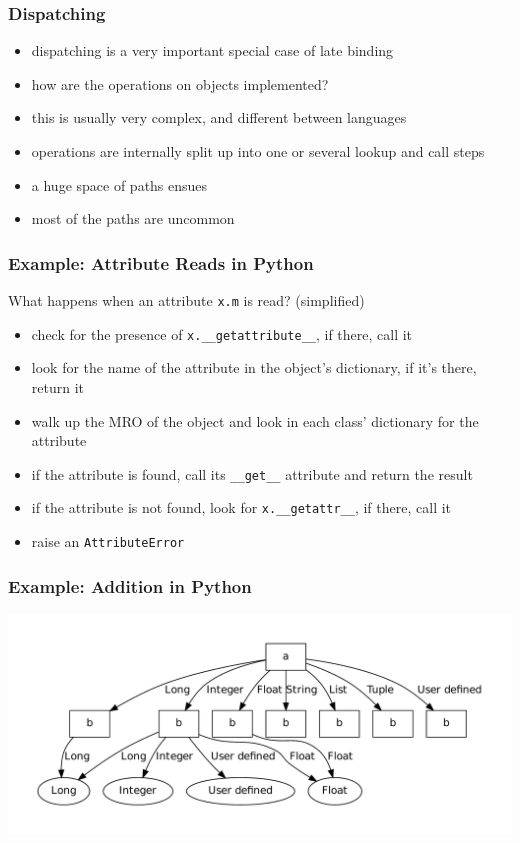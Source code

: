 \documentclass[utf8x]{beamer}
\begin{document}
\begin{frame}
  \frametitle{Dispatching}
  \begin{itemize}
      \item dispatching is a very important special case of late binding
      \item how are the operations on objects implemented?
      \item this is usually very complex, and different between languages
      \pause
      \item operations are internally split up into one or several lookup and call steps
      \item a huge space of paths ensues
      \item most of the paths are uncommon
  \end{itemize}
\end{frame}

\begin{frame}
  \frametitle{Example: Attribute Reads in Python}
  What happens when an attribute \texttt{x.m} is read? (simplified)
  \begin{itemize}
      \item check for the presence of \texttt{x.\_\_getattribute\_\_}, if there, call it
      \pause
      \item look for the name of the attribute in the object's dictionary, if it's there, return it
      \pause
      \item walk up the MRO of the object and look in each class' dictionary for the attribute
      \pause
      \item if the attribute is found, call its \texttt{\_\_get\_\_} attribute and return the result
      \pause
      \item if the attribute is not found, look for \texttt{x.\_\_getattr\_\_}, if there, call it
      \pause
      \item raise an \texttt{AttributeError}
  \end{itemize}
\end{frame}

\begin{frame}
  \frametitle{Example: Addition in Python}
  \includegraphics[scale=0.5]{figures/add.pdf}
\end{frame}
\end{document}
